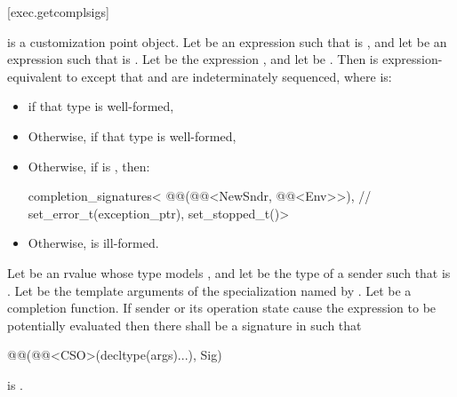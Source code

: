 [exec.getcomplsigs]{}

\pnum
{} is a customization point object.
Let  be an expression
such that  is , and
let  be an expression
such that  is .
Let  be the expression
, and
let  be .
Then  is expression-equiva\-lent to
except that  and  are
indeterminately sequenced,
where  is:
\begin{itemize}
\item
{}
if that type is well-formed,

\item
Otherwise, 
if that type is well-formed,

\item
Otherwise,
if  is ,
then:
\begin{codeblock}
completion_signatures<
  @@(@@<NewSndr, @@<Env>>),        // 
  set_error_t(exception_ptr),
  set_stopped_t()>
\end{codeblock}

\item
Otherwise,  is ill-formed.
\end{itemize}

\pnum
Let  be an rvalue
whose type  models , and
let  be the type of a sender
such that  is .
Let  be the template arguments of
the  specialization
named by .
Let  be a completion function.
If sender  or its operation state cause
the expression 
to be potentially evaluated
then there shall be a signature  in 
such that
\begin{codeblock}
@@(@@<CSO>(decltype(args)...), Sig)
\end{codeblock}
is .

